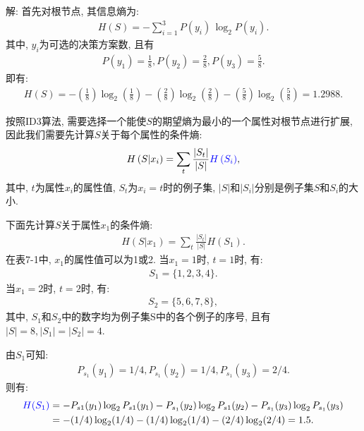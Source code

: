 解:  首先对根节点, 其信息熵为:
\begin{align}
    H(S)=-\sum_{i=1}^{3} P\left (y_{i}\right)\, \log_ {2} P\left (y_{i}\right).
\end{align}
其中, $y_i$为可选的决策方案数, 且有
\begin{align}
    P(y_1)=\frac 1 8, P (y_2)=\frac 2 8, P (y_3)=\frac 5 8.
\end{align}
即有:
\begin{align}
    H(S)= -\left (\frac 1 8\right)\log_2 \left (\frac 1 8\right)- \left (\frac 2 8\right)\log_ 2\left (\frac 2 8 \right)- \left (\frac 5 8\right)\log_ 2\left (\frac 5 8\right) =1.2988.
\end{align}

按照ID3算法, 需要选择一个能使$S$的期望熵为最小的一个属性对根节点进行扩展, 因此我们需要先计算$S$关于每个属性的条件熵:
\begin{align}\label{EntropyAIC67.7}
    H\left (S | x_{i}\right)=\sum_{t} \frac{\left|S_{t}\right|}{|S|} \textcolor[rgb]{0,0,1}{H\left (S_{i}\right)},
\end{align}
其中, $t$为属性$x_i$的属性值, $S_t$为$x_i=t$时的例子集, $|S|$和$|S_i|$分别是例子集$S$和$S_i$的大小.

下面先计算$S$关于属性$x_1$的条件熵:
\begin{align}
    H\left (S|x_{1}\right)=\sum_{t} \frac{\left|S_{t}\right|}{|S|} H\left (S_{1}\right).
\end{align}
在表7-1中, $x_1$的属性值可以为1或2. 当$x_1=1$时, $t=1$时, 有:
\begin{align}
    S_1=\{1, 2, 3, 4\}.
\end{align}
当$x_1=2$时, $t=2$时, 有:
\begin{align}
    S_2=\{5, 6, 7, 8\},
\end{align}
其中, $S_1$和$S_2$中的数字均为例子集S中的各个例子的序号, 且有$|S|=8,|S_1|=|S_2|=4$.

由$S_1$可知:
\begin{align}
    P_{s_1} (y_1)=1/4,     P_{s_1} (y_2)=1/4,     P_{s_1} (y_3)=2/4.
\end{align}
则有:
\begin{align}
    \textcolor[rgb]{0,0,1}{H (S_1)}&= - P_{s1} (y_1)\log_2 P_{s1} (y_1) - P_{s_1} (y_2)\log_2 P_{s1} (y_2 )- P_{s_1} (y_3)\log_2 P_{s_1} (y_3 )\notag\\
           &= - (1/4)\log_2 (1/4)- (1/4)\log_2 (1/4)- (2/4)\log_2 (2/4) =1.5.
\end{align}


